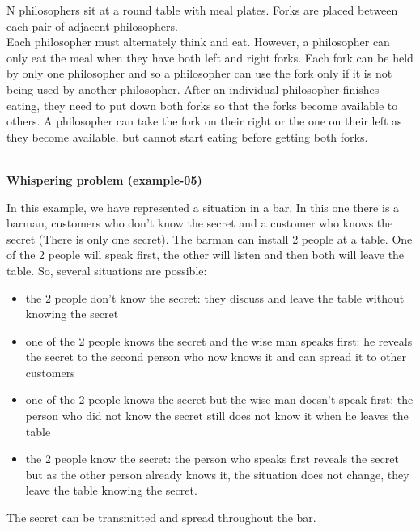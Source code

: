 \documentclass[11pt]{report}
\begin{document}
\tabto{0cm}N philosophers sit at a round table with meal plates. Forks are placed between each pair of adjacent philosophers.
\\ Each philosopher must alternately think and eat. However, a philosopher can only eat the meal when they have both left and right forks. Each fork can be held by only one philosopher and so a philosopher can use the fork only if it is not being used by another philosopher. After an individual philosopher finishes eating, they need to put down both forks so that the forks become available to others. A philosopher can take the fork on their right or the one on their left as they become available, but cannot start eating before getting both forks.
\\ \\
{}
\tabto{0cm} {\LARGE \textbf{Whispering problem (example-05)}}
\vspace*{3pt}
\vspace*{10pt}

\tabto{0cm}In this example, we have represented a situation in a bar. In this one there is a barman, customers who don't know the secret and a customer who knows the secret (There is only one secret). The barman can install 2 people at a table.  One of the 2 people will speak first, the other will listen and then both will leave the table. So, several situations are possible:
\begin{itemize}
    \item the 2 people don't know the secret: they discuss and leave the table without knowing the secret \\
    \item  one of the 2 people knows the secret and the wise man speaks first: he reveals the secret to the second person who now knows it and can spread it to other customers \\
    \item one of the 2 people knows the secret but the wise man doesn't speak first: the person who did not know the secret still does not know it when he leaves the table \\
    \item the 2 people know the secret: the person who speaks first reveals the secret but as the other person already knows it, the situation does not change, they leave the table knowing the secret.
\end{itemize}
The secret can be transmitted and spread throughout the bar.
\end{document}
